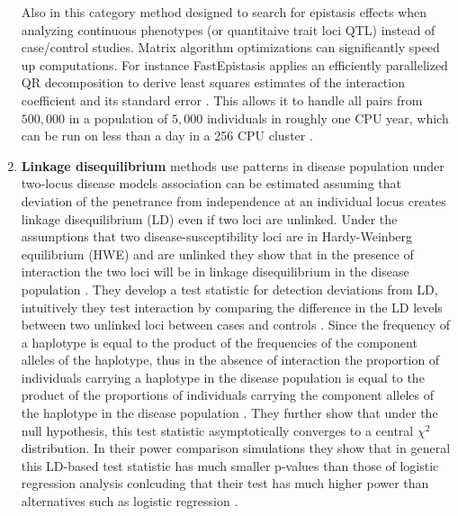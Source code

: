 \begin{enumerate}
	Also in this category method designed to search for epistasis effects when analyzing continuous phenotypes (or quantitaive trait loci QTL) instead of case/control studies.
Matrix algorithm optimizations can significantly speed up computations.
For instance FastEpistasis applies an efficiently parallelized QR decomposition to derive least squares estimates of the interaction coefficient and its standard error \cite{schupbach2010fastepistasis}.
This allows it to handle all pairs from $500,000$ in a population of $5,000$ individuals in roughly one CPU year, which can be run on less than a day in a 256 CPU cluster \cite{schupbach2010fastepistasis}.

	\item \textbf{Linkage disequilibrium} methods use patterns in disease population under two-locus disease models \cite{zhao2006test} association can be estimated assuming that deviation of the penetrance from independence at an individual locus creates linkage disequilibrium (LD) even if two loci are unlinked.  \cite{zhao2006test}
Under the assumptions that two disease-susceptibility loci are in Hardy-Weinberg equilibrium (HWE) and are unlinked
they show that in the presence of interaction the two loci will be in linkage disequilibrium in the disease population \cite{zhao2006test}.
They develop a test statistic for detection deviations from LD, intuitively they test interaction by comparing the difference in the LD levels between two unlinked loci between cases and controls \cite{zhao2006test}.
Since the frequency of a haplotype is equal to the product of the frequencies of the component alleles of the haplotype, thus in the absence of interaction the proportion of individuals carrying a haplotype in the disease population is equal to the product of the proportions of individuals carrying the component alleles of the haplotype in the disease population \cite{zhao2006test}.
They further show that under the null hypothesis, this test statistic asymptotically converges to a central $\chi^2$ distribution.
In their power comparison simulations they show that in general this LD-based test statistic has much smaller p-values than those of logistic regression analysis \cite{zhao2006test} conlcuding that their test has much higher power than alternatives such as logistic regression \cite{zhao2006test}.


\end{enumerate}
